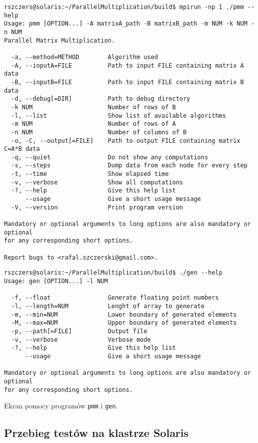 \begin{listing}[h]
\begin{verbatim}
rszczers@solaris:~/ParallelMultiplication/build$ mpirun -np 1 ./pmm --help
Usage: pmm [OPTION...] -A matrixA_path -B matrixB_path -m NUM -k NUM -n NUM
Parallel Matrix Multiplication.

  -a, --method=METHOD        Algorithm used
  -A, --inputA=FILE          Path to input FILE containing matrix A data
  -B, --inputB=FILE          Path to input FILE containing matrix B data
  -d, --debug[=DIR]          Path to debug directory
  -k NUM                     Number of rows of B
  -l, --list                 Show list of available algorithms
  -m NUM                     Number of rows of A
  -n NUM                     Number of columns of B
  -o, -C, --output[=FILE]    Path to output FILE containing matrix C=A*B data
  -q, --quiet                Do not show any computations
  -s, --steps                Dump data from each node for every step
  -t, --time                 Show elapsed time
  -v, --verbose              Show all computations
  -?, --help                 Give this help list
      --usage                Give a short usage message
  -V, --version              Print program version

Mandatory or optional arguments to long options are also mandatory or optional
for any corresponding short options.

Report bugs to <rafal.szczerski@gmail.com>.
\end{verbatim}
\begin{verbatim}
rszczers@solaris:~/ParallelMultiplication/build$ ./gen --help
Usage: gen [OPTION...] -l NUM

  -f, --float                Generate floating point numbers
  -l, --length=NUM           Lenght of array to generate
  -m, --min=NUM              Lower boundary of generated elements
  -M, --max=NUM              Upper boundary of generated elements
  -p, --path[=FILE]          Output file
  -v, --verbose              Verbose mode
  -?, --help                 Give this help list
      --usage                Give a short usage message

Mandatory or optional arguments to long options are also mandatory or optional
for any corresponding short options.
\end{verbatim}
\caption{Ekran pomocy programów \texttt{pmm} i \texttt{gen}.}
\label{ls:pmm_help}
\end{listing}

\subsection{Przebieg testów na klastrze Solaris}



